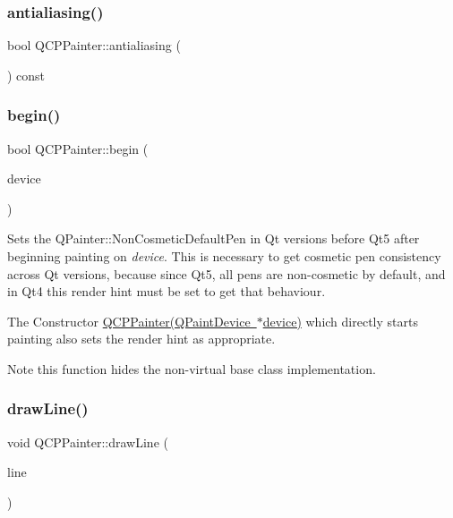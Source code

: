 \subsubsection{\texorpdfstring{antialiasing()}{antialiasing()}}
{\footnotesize\ttfamily bool Q\+C\+P\+Painter\+::antialiasing (\begin{DoxyParamCaption}{ }\end{DoxyParamCaption}) const\hspace{0.3cm}{\ttfamily [inline]}}

\mbox{\label{class_q_c_p_painter_a0a41146ccd619dceab6e25ec7b46b044}} 
\subsubsection{\texorpdfstring{begin()}{begin()}}
{\footnotesize\ttfamily bool Q\+C\+P\+Painter\+::begin (\begin{DoxyParamCaption}\item[{Q\+Paint\+Device $\ast$}]{device }\end{DoxyParamCaption})}

Sets the Q\+Painter\+::\+Non\+Cosmetic\+Default\+Pen in Qt versions before Qt5 after beginning painting on {\itshape device}. This is necessary to get cosmetic pen consistency across Qt versions, because since Qt5, all pens are non-\/cosmetic by default, and in Qt4 this render hint must be set to get that behaviour.

The Constructor \mbox{\hyperlink{class_q_c_p_painter_ae58dbb1795ddc4351ab324dc9898aa22}{Q\+C\+P\+Painter(\+Q\+Paint\+Device $\ast$device)}} which directly starts painting also sets the render hint as appropriate.

\begin{DoxyNote}{Note}
this function hides the non-\/virtual base class implementation. 
\end{DoxyNote}
\mbox{\label{class_q_c_p_painter_a0b4b1b9bd495e182c731774dc800e6e0}} 
\subsubsection{\texorpdfstring{drawLine()}{drawLine()}\hspace{0.1cm}{\footnotesize\ttfamily [1/2]}}
{\footnotesize\ttfamily void Q\+C\+P\+Painter\+::draw\+Line (\begin{DoxyParamCaption}\item[{const Q\+LineF \&}]{line }\end{DoxyParamCaption})}

